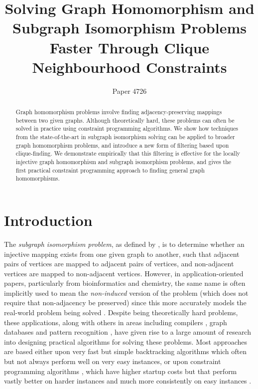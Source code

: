 \documentclass{article}
\title{Solving Graph Homomorphism and Subgraph Isomorphism Problems Faster Through Clique Neighbourhood Constraints}
\author{Paper 4726}
\newcommand{\citet}[1]{\citeauthor{#1} \shortcite{#1}}
\begin{document}
\maketitle

\begin{abstract}
    Graph homomorphism problems involve finding adjacency-preserving mappings between two given
    graphs.  Although theoretically hard, these problems can often be solved in practice
    using constraint programming algorithms. We show how techniques from the state-of-the-art in
    subgraph isomorphism solving can be applied to broader graph homomorphism problems, and
    introduce a new form of filtering based upon clique-finding. We demonstrate empirically that
    this filtering is effective for the locally injective graph homomorphism and subgraph
    isomorphism problems, and gives the first practical constraint programming approach to
    finding general graph homomorphisms.
\end{abstract}

\section{Introduction}

The \emph{subgraph isomorphism problem}, as defined by \citet{DBLP:books/fm/GareyJ79}, is to
determine whether an injective mapping exists from one given graph to another, such that adjacent
pairs of vertices are mapped to adjacent pairs of vertices, and non-adjacent vertices are mapped to
non-adjacent vertices.  However, in application-oriented papers, particularly from bioinformatics
and chemistry, the same name is often implicitly used to mean the \emph{non-induced} version of the
problem (which does not require that non-adjacency be preserved) since this more accurately models
the real-world problem being solved \cite{Willett1999,EhrlichR11}. Despite being theoretically hard
problems, these applications, along with
others in areas including compilers \cite{DBLP:conf/cp/BlindellLCS15},
graph databases \cite{DBLP:journals/jair/McCreeshPST18}
and pattern recognition \cite{DBLP:journals/ijprai/FoggiaPV14},
have given rise to a large amount of research into designing practical algorithms for solving these
problems.  Most approaches are based either upon very fast but simple backtracking algorithms
\cite{DBLP:journals/pami/CordellaFSV04,DBLP:journals/bmcbi/BonniciGPSF13,DBLP:conf/gbrpr/CarlettiFSV17}
which often but not always perform well on very easy instances, or upon constraint programming
algorithms
\cite{DBLP:journals/constraints/ZampelliDS10,DBLP:journals/ai/Solnon10,DBLP:conf/cp/AudemardLMGP14,DBLP:conf/cp/McCreeshP15,DBLP:conf/cpaior/ArchibaldDHMP019},
which have higher startup costs but that perform vastly better on harder instances and much more
consistently on easy instances \cite{DBLP:journals/jair/McCreeshPST18,DBLP:conf/gbrpr/Solnon19}.
\end{document}
